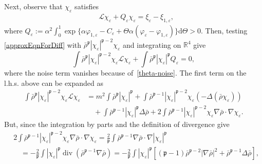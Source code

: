 \documentclass{article}
\newcommand{\assign}{:=}
\newcommand{\mathd}{\mathrm{d}}
\newcommand{\tmop}[1]{\ensuremath{\operatorname{#1}}}
\begin{document}
Next, observe that $\chi_{\varepsilon}$ satisfies
\begin{equation}
  \begin{array}{ll}
    & \mathcal{L} \chi_{\varepsilon} + Q_{\varepsilon} \chi_{\varepsilon} =
    \xi_{\varepsilon} - \xi_{1, \varepsilon},
  \end{array} \label{approxEqnForDiff}
\end{equation}
where $Q_{\varepsilon} \assign \alpha^2 \int_0^1 \exp \{ \alpha \varphi_{1,
\varepsilon} - C_{\varepsilon} + \Theta \alpha (\varphi_{\varepsilon} -
\varphi_{1, \varepsilon}) \} \mathd \Theta > 0$. Then, testing
\eqref{approxEqnForDiff} with $\bar{\rho}^{\mathfrak{p}} |
\chi_{\varepsilon} |^{\mathfrak{p}- 2} \chi_{\varepsilon}$ and
integrating on $\mathbb{R}^4$ give
%
\begin{equation}
  \int \bar{\rho}^{\mathfrak{p}} | \chi_{\varepsilon} |^{\mathfrak{p}- 2}
  \chi_{\varepsilon} \mathcal{L} \chi_{\varepsilon} + \int
  \bar{\rho}^{\mathfrak{p}} | \chi_{\varepsilon} |^{\mathfrak{p}}
  Q_{\varepsilon} = 0, \label{eqn1}
\end{equation}
%
where the noise term vanishes because of~\eqref{theta-noise}. The first term
on the l.h.s. above can be expanded as
%
\begin{align*}
    \int \bar{\rho}^{\mathfrak{p}} | \chi_{\varepsilon} |^{\mathfrak{p}-
     2} \chi_{\varepsilon} \mathcal{L} \chi_{\varepsilon} & = m^2 \int
     \bar{\rho}^{\mathfrak{p}} | \chi_{\varepsilon} |^{\mathfrak{p}} + \int
     \bar{\rho}^{\mathfrak{p}- 1} | \chi_{\varepsilon} |^{\mathfrak{p}- 2}
     \chi_{\varepsilon} (- \Delta (\bar{\rho} \chi_{\varepsilon})) \\
     & \quad +
     \int \bar{\rho}^{\mathfrak{p}- 1} | \chi_{\varepsilon}
     |^{\mathfrak{p}} \Delta \bar{\rho} + 2 \int \bar{\rho}^{\mathfrak{p}- 1} | \chi_{\varepsilon}
     |^{\mathfrak{p}- 2} \chi_{\varepsilon} \nabla \bar{\rho} \cdot \nabla
     \chi_{\varepsilon} .
\end{align*}
But, since the integration by parts and the definition of divergence give
%
\begin{align*}
    & 2 \int \bar{\rho}^{\mathfrak{p}- 1} | \chi_{\varepsilon}
     |^{\mathfrak{p}- 2} \chi_{\varepsilon} \nabla \bar{\rho} \cdot \nabla
     \chi_{\varepsilon}  =  \frac{2}{\mathfrak{p}} \int
     \bar{\rho}^{\mathfrak{p}- 1} \nabla \bar{\rho} \cdot \nabla |
     \chi_{\varepsilon} |^{\mathfrak{p}}\\
     & \quad = - \frac{2}{\mathfrak{p}} \int | \chi_{\varepsilon}
     |^{\mathfrak{p}} \tmop{div} (\bar{\rho}^{\mathfrak{p}- 1} \nabla
     \bar{\rho}) = - \frac{2}{\mathfrak{p}} \int | \chi_{\varepsilon}
     |^{\mathfrak{p}}  [(\mathfrak{p}- 1) \bar{\rho}^{\mathfrak{p}- 2} |
     \nabla \bar{\rho} |^2 + \bar{\rho}^{\mathfrak{p}- 1} \Delta \bar{\rho}],
\end{align*}
\end{document}
